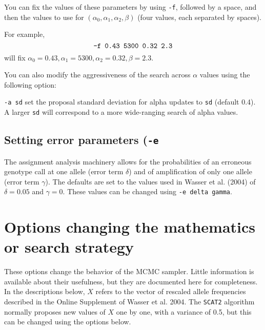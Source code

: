 \documentclass[10pt,titlepage,times,letterpaper]{article}
\def\SCAT{{\tt SCAT2} }
\begin{document}
You can fix the values of these
parameters by using {\tt -f}, followed by a space, and then the values
to use for $(\alpha_0,\alpha_1,\alpha_2,\beta)$ (four values, each
separated by spaces).

For example,
$$\text{\tt -f 0.43 5300 0.32 2.3}$$ will fix $\alpha_0 = 0.43, \alpha_1 =
5300, \alpha_2 = 0.32, \beta = 2.3$.

You can also modify the aggressiveness of the search across $\alpha$
values using the following option:

{\tt -a sd} set the proposal standard deviation for alpha updates to
{\tt sd} (default 0.4).  A larger {\tt sd} will correspond to a more
wide-ranging search of alpha values.

\subsection{Setting error parameters ({\tt -e}}

The assignment analysis machinery allows for the probabilities
of an erroneous genotype call at one allele
(error term $\delta$) and of amplification of only one allele (error term
$\gamma$).  The defaults are set to the values used in Wasser et al. (2004)
of $\delta = 0.05$ and $\gamma = 0$.  These values can be changed
using {\tt -e delta gamma}.

\section{Options changing the mathematics or search strategy}

These options change the behavior of the MCMC sampler.  Little information
is available about their usefulness, but they
are documented here for completeness.  In the descriptions below, $X$ refers
to the vector of rescaled allele frequencies described in the
Online Supplement of Wasser et al. 2004.  The \SCAT algorithm normally
proposes new values of $X$ one by one, with a variance of 0.5, but
this can be changed using the options below.
\end{document}
